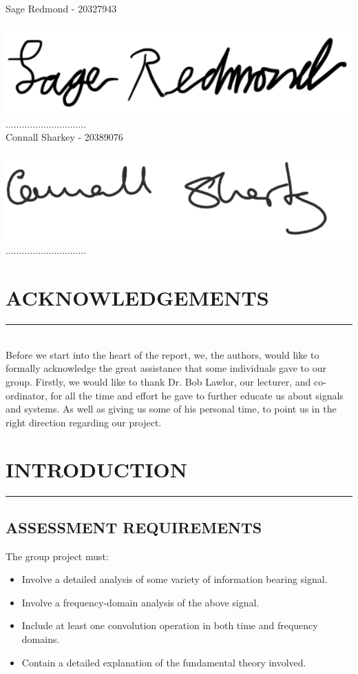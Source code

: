 \documentclass[12pt,a4paper]{article}
\begin{document}
\begin{flushright}
		\ \\
		\vspace*{0.8cm}
		Sage Redmond - 20327943 \\
		\ \\		
		\includegraphics[width=0.2\linewidth]{Sage}\\
		\vspace*{-1cm}
		$\ldots\ldots\ldots\ldots\ldots\ldots\ldots\ldots\ldots\ldots$
		\ \\
		Connall Sharkey - 20389076\\
		\ \\		
		\includegraphics[width=0.25\linewidth]{Sharkey}\\
		\vspace*{-1cm}
		$\ldots\ldots\ldots\ldots\ldots\ldots\ldots\ldots\ldots\ldots$
		\ \\
	\end{flushright}
	\newpage
	
\Large
\section{ACKNOWLEDGEMENTS}
\vspace{-5mm}
\rule{\linewidth}{0.1mm}
\vspace{5mm}\\
\normalsize
Before we start into the heart of the report, we, the authors, would like to formally acknowledge the great assistance that some individuals gave to our group. Firstly, we would like to thank Dr. Bob Lawlor, our lecturer, and co-ordinator, for all the time and effort he gave to further educate us about signals and systems. As well as giving us some of his personal time, to point us in the right direction regarding our project.
\newpage

\Large
\section{INTRODUCTION}
\vspace{-5mm}
\rule{\linewidth}{0.1mm}
\large
\subsection{ASSESSMENT REQUIREMENTS}
\normalsize
The group project must:
\begin{itemize}
	\item Involve a detailed analysis of some variety of information bearing signal.
	\item Involve a frequency-domain analysis of the above signal.
	\item Include at least one convolution operation in both time and frequency domains.
	\item Contain a detailed explanation of the fundamental theory involved.
\end{itemize}
\end{document}
